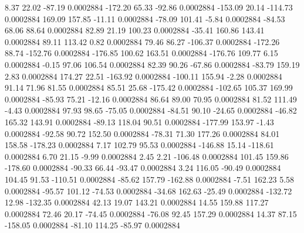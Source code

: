         8.37       22.02      -87.19     0.0002884
     -172.20       65.33      -92.86     0.0002884
     -153.09       20.14     -114.73     0.0002884
      169.09      157.85      -11.11     0.0002884
      -78.09      101.41       -5.84     0.0002884
      -84.53       68.06       88.64     0.0002884
       82.89       21.19      100.23     0.0002884
      -35.41      160.86      143.41     0.0002884
       89.11      113.42        0.82     0.0002884
       79.46       86.27     -106.37     0.0002884
     -172.26       88.74     -152.76     0.0002884
     -176.85      100.62      163.51     0.0002884
     -176.76      109.77        6.15     0.0002884
       -0.15       97.06      106.54     0.0002884
       82.39       90.26      -67.86     0.0002884
      -83.79      159.19        2.83     0.0002884
      174.27       22.51     -163.92     0.0002884
     -100.11      155.94       -2.28     0.0002884
       91.14       71.96       81.55     0.0002884
       85.51       25.68     -175.42     0.0002884
     -102.65      105.37      169.99     0.0002884
      -85.93       75.21      -12.16     0.0002884
       86.64       89.00       70.95     0.0002884
       81.52      111.49       -4.43     0.0002884
       97.93       98.65      -75.05     0.0002884
      -84.51       90.10      -24.65     0.0002884
      -46.82      165.32      143.91     0.0002884
      -89.13      118.04       90.51     0.0002884
     -177.99      153.97       -1.43     0.0002884
      -92.58       90.72      152.50     0.0002884
      -78.31       71.30      177.26     0.0002884
       84.01      158.58     -178.23     0.0002884
        7.17      102.79       95.53     0.0002884
     -146.88       15.14     -118.61     0.0002884
        6.70       21.15       -9.99     0.0002884
        2.45        2.21     -106.48     0.0002884
      101.45      159.86     -178.60     0.0002884
      -90.33       66.44      -93.47     0.0002884
        3.24      116.05      -90.49     0.0002884
      104.45       91.53     -110.51     0.0002884
      -85.62      157.79     -162.88     0.0002884
       -7.51      162.23        5.58     0.0002884
      -95.57      101.12      -74.53     0.0002884
      -34.68      162.63      -25.49     0.0002884
     -132.72       12.98     -132.35     0.0002884
       42.13       19.07      143.21     0.0002884
       14.55      159.88      117.27     0.0002884
       72.46       20.17      -74.45     0.0002884
      -76.08       92.45      157.29     0.0002884
       14.37       87.15     -158.05     0.0002884
      -81.10      114.25      -85.97     0.0002884
